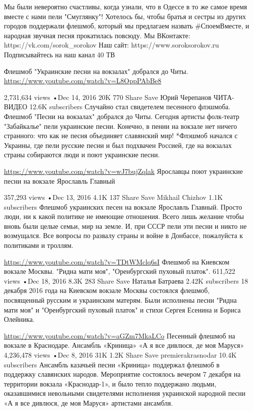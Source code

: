 Мы были невероятно счастливы, когда узнали, что в Одессе в то же самое время вместе с нами пели "Смуглянку"! 
Хотелось бы, чтобы братья и сестры из других городов поддержали флешмоб, который мы предлагаем назвать #СпоемВместе​, и народная звучная песня прокатилась повсюду.
Мы ВКонтакте: https://vk.com/sorok_sorokov
Наш сайт: https://www.soroksorokov.ru
Подписывайтесь на наш канал 40 ТВ

Флешмоб "Украинские песни на вокзалах" добрался до Читы.
\url{https://www.youtube.com/watch?v=L8OppPAbBe8}

2,731,634 views
•Dec 14, 2016
20K
770
Share
Save
Юрий Черепанов ЧИТА-ВИДЕО
12.6K subscribers
Случайно стал свидетелем песенного флэшмоба.
Флешмоб "Песни на вокзалах" добрался до Читы. 
Сегодня артисты фолк-театр "Забайкалье" пели украинские песни. Конечно, в пении на вокзале нет ничего странного: что как не песня объединяет славянский мир! 
*Флэшмоб начался с Украины, где пели русские песни и был подхвачен Россией, где на вокзалах страны собираются люди и поют украинские песни.

\url{https://www.youtube.com/watch?v=wJ7bujZqlak}
Ярославцы поют украинские песни на вокзале Ярославль Главный

357,293 views
•Dec 13, 2016
4.1K
137
Share
Save
Mikhail Chizhov
1.1K subscribers
Флешмоб украинских песен на вокзале Ярославль Главный. Просто люди, ни к какой политике не имеющие отношения. Всего лишь желание чтобы вновь были целые семьи, мир на земле. И, при СССР пели эти песни и никто не возмущался. Все вопросы по развалу страны и войне в Донбассе, пожалуйста к политиками и троллям.

\url{https://www.youtube.com/watch?v=TDtWMclq6sI}
Флешмоб на Киевском вокзале Москвы. "Ридна мати моя", "Оренбургский пуховый платок".
611,522 views
•Dec 18, 2016
8.3K
283
Share
Save
Наталья Батраева
2.42K subscribers
18 декабря 2016 года на Киевском вокзале Москвы состоялся флешмоб, посвященный русским и украинским матерям.
Были исполнены песни "Ридна мати моя" и "Оренбургский пуховый платок" и стихи Сергея Есенина и Бориса Олейника.

\url{https://www.youtube.com/watch?v=aGZm7MkaLCo}
Песенный флешмоб на вокзале в Краснодаре. Ансамбль «Криница» «А я все дивлюся, де моя Маруся»
4,236,478 views
•Dec 8, 2016
31K
1.2K
Share
Save
premierakrasnodar
10.4K subscribers
Ансамбль казачьей песни «Криница» поддержал флешмоб в поддержку славянских народов. Мероприятие состоялось вечером 7 декабря на территории вокзала «Краснодар-1», и было тепло поддержано людьми, оказавшимися невольными свидетелями исполнения украинской народной песни «А я все дивлюся, де моя Маруся» артистами ансамбля.

